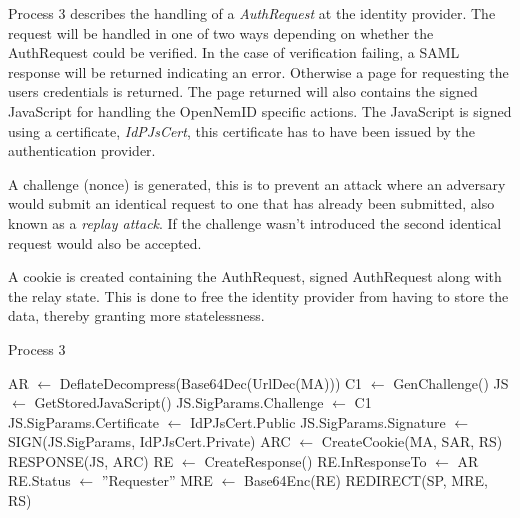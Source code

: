 \documentclass[twosided]{report}
\begin{document}
Process 3 describes the handling of a \emph{AuthRequest} at the identity provider. The request will be handled in one of two ways depending on whether the AuthRequest could be verified. In the case of verification failing, a SAML response will be returned indicating an error. Otherwise a page for requesting the users credentials is returned. The page returned will also contains the signed JavaScript for handling the OpenNemID specific actions. The JavaScript is signed using a certificate, \emph{IdPJsCert}, this certificate has to have been issued by the authentication provider.
\par
A challenge (nonce) is generated, this is to prevent an attack where an adversary would submit an identical request to one that has already been submitted, also known as a \emph{replay attack}. If the challenge wasn't introduced the second identical request would also be accepted.
\par
A cookie is created containing the AuthRequest, signed AuthRequest along with the relay state. This is done to free the identity provider from having to store the data, thereby granting more statelessness.
\begin{algorithm}[H]
	\caption{Process 3}
	\begin{algorithmic}
		\STATE AR $\leftarrow$ DeflateDecompress(Base64Dec(UrlDec(MA)))
			\STATE C1 $\leftarrow$ GenChallenge()
			\STATE JS $\leftarrow$ GetStoredJavaScript()
			\STATE JS.SigParams.Challenge $\leftarrow$ C1
			\STATE JS.SigParams.Certificate $\leftarrow$ IdPJsCert.Public
			\STATE JS.SigParams.Signature $\leftarrow$ SIGN(JS.SigParams, IdPJsCert.Private)
			\STATE ARC $\leftarrow$ CreateCookie(MA, SAR, RS)
			\RETURN RESPONSE(JS, ARC)
		\ELSE
			\STATE RE $\leftarrow$ CreateResponse()
			\STATE RE.InResponseTo $\leftarrow$ AR
			\STATE RE.Status $\leftarrow$ ”Requester”
			\STATE MRE $\leftarrow$ Base64Enc(RE)
			\RETURN REDIRECT(SP, MRE, RS)
		\ENDIF
	\end{algorithmic}
\end{algorithm}
\end{document}
